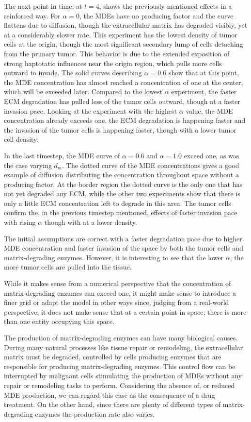The next point in time, at $t=4$, shows the previously mentioned effects in a reinforced way. For $\alpha=0$, the MDEs have no producing factor and the curve flattens due to diffusion, though the extracellular matrix has degraded visibly, yet at a considerably slower rate. This experiment has the lowest density of tumor cells at the origin, though the most significant secondary lump of cells detaching from the primary tumor. This behavior is due to the extended exposition of strong haptotatic influences near the origin region, which pulls more cells outward to invade. The solid curves describing $\alpha = 0.6$ show that at this point, the MDE concentration has almost reached a concentration of one at the center, which will be exceeded later. Compared to the lowest $\alpha$ experiment, the faster ECM degradation has pulled less of the tumor cells outward, though at a faster invasion pace. Looking at the experiment with the highest $\alpha$ value, the MDE concentration already exceeds one, the ECM degradation is happening faster and the invasion of the tumor cells is happening faster, though with a lower tumor cell density.

In the last timestep, the MDE curve of $\alpha=0.6$ and $\alpha=1.0$ exceed one, as was the case varying $d_m$. The dotted curve of the MDE concentrations gives a good example of diffusion distributing the concentration throughout space without a producing factor. At the border region the dotted curve is the only one that has not yet degraded any ECM, while the other two experiments show that there is only a little ECM concentration left to degrade in this area. 
The tumor cells confirm the, in the previous timestep mentioned, effects of faster invasion pace with rising $\alpha$ though with at a lower density.

The initial assumptions are correct with a faster degradation pace due to higher MDE concentration and faster invasion of the space by both the tumor cells and matrix-degrading enzymes. However, it is interesting to see that the lower $\alpha$, the more tumor cells are pulled into the tissue.

While it makes sense from a numerical perspective that the concentration of matrix-degrading enzumes can exceed one, it might make sense to introduce a finer grid or adapt the model in other ways since, judging from a real-world perspective, it does not make sense that at a certain point in space, there is more than one entity occupying this space.

The production of matrix-degrading enzymes can have many biological causes. During many natural processes like tissue repair or remodeling, the extracellular matrix must be degraded, controlled by cells producing enzymes that are responsible for producing matrix-degrading enzymes. This control flow can be interrupted by malignant cells stimulating the production of MDEs without any repair or remodeling tasks to perform. Considering the absence of, or reduced MDE production, we can regard this case as the consequence of a drug treatment. On the other hand, since there are plenty of different types of matrix-degrading enzymes the production rate also varies.

